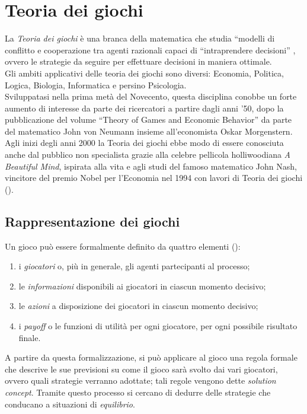 \section{Teoria dei giochi}

La \emph{Teoria dei giochi} è una branca della matematica che studia ``modelli di conflitto e cooperazione tra agenti razionali capaci di ``intraprendere decisioni'' \cite{gtheory}, ovvero le strategie da seguire per effettuare decisioni in maniera ottimale.\\
Gli ambiti applicativi delle teoria dei giochi sono diversi: Economia, Politica, Logica, Biologia, Informatica e persino Psicologia.\\
Sviluppatasi nella prima metà del Novecento, questa disciplina conobbe un forte aumento di interesse da parte dei ricercatori a partire dagli anni '50, dopo la pubblicazione del volume ``Theory of Games and Economic Behavior'' da parte del matematico John von Neumann insieme all'economista Oskar Morgenstern. %
Agli inizi degli anni 2000 la Teoria dei giochi ebbe modo di essere conosciuta anche dal pubblico non specialista grazie alla celebre pellicola holliwoodiana \emph{A Beautiful Mind}, ispirata alla vita e agli studi del famoso matematico John Nash, vincitore del premio Nobel per l'Economia nel 1994 con lavori di Teoria dei giochi (\cite{jnash}).


\subsection{Rappresentazione dei giochi}

Un gioco può essere formalmente definito da quattro elementi (\cite{ramusen}):
\begin{enumerate}
   \item i \emph{giocatori} o, più in generale, gli agenti partecipanti al processo;
   \item le \emph{informazioni} disponibili ai giocatori in ciascun momento decisivo;
   \item le \emph{azioni} a disposizione dei giocatori in ciascun momento decisivo;
   \item i \emph{payoff} o le funzioni di utilità per ogni giocatore, per ogni possibile risultato finale.   
\end{enumerate}
A partire da questa formalizzazione, si  può applicare al gioco una regola formale che descrive le sue previsioni su come il gioco sarà svolto dai vari giocatori, ovvero quali strategie verranno adottate; tali regole vengono dette \emph{solution concept}. Tramite questo processo si cercano di dedurre delle strategie che conducano a situazioni di \emph{equilibrio}.




